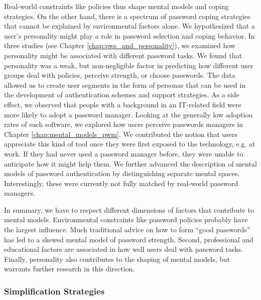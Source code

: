 Real-world constraints like policies thus shape mental models and coping strategies. On the other hand, there is a spectrum of password coping strategies that cannot be explained by environmental factors alone. We hypothesized that a user's personality might play a role in password selection and coping behavior. In three studies (see Chapter \ref{chap:pws_and_personality}), we examined how personality might be associated with different password tasks. We found that personality was a weak, but non-negligible factor in predicting how different user groups deal with policies, perceive strength, or choose passwords. The data allowed us to create user segments in the form of personas that can be used in the development of authentication schemes and support strategies. 
As a side effect, we observed that people with a background in an IT-related field were more likely to adopt a password manager. Looking at the generally low adoption rates of such software, we explored how users perceive passwords managers in Chapter \ref{chap:mental_models_pwm}. We contributed the notion that users appreciate this kind of tool once they were first exposed to the technology, e.g. at work. If they had never used a password manager before, they were unable to anticipate how it might help them. We further advanced the description of mental models of password authentication by distinguishing separate mental spaces. Interestingly, these were currently not fully matched by real-world password managers. 

In summary, we have to respect different dimensions of factors that contribute to mental models. Environmental constraints like password policies probably have the largest influence. Much traditional advice on how to form ``good passwords'' has led to a skewed mental model of password strength. Second, professional and educational factors are associated in how well users deal with password tasks. Finally, personality also contributes to the shaping of mental models, but warrants further research in this direction. %

\subsubsection{Simplification Strategies}

